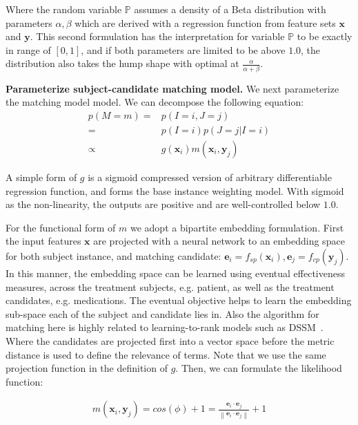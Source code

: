 \documentclass{article}
\newcommand\norm[1]{\left\lVert#1\right\rVert}
\begin{document}
Where the random variable $\mathbb{P}$ assumes a density of a Beta distribution with parameters $\alpha, \beta$ which are derived with a regression function from feature sets $\mathbf{x}$ and $\mathbf{y}$. This second formulation has the interpretation for variable $\mathbb{P}$ to be exactly in range of $[0, 1]$, and if both parameters are limited to be above $1.0$, the distribution also takes the hump shape with optimal at $\frac{\alpha}{\alpha + \beta}$. 

\textbf{Parameterize subject-candidate matching model.} We next parameterize the matching model model. 
We can decompose the following equation: 
\begin{align} 
\label{eq:matching_func} 
p(M = m) =& p (I = i, J = j) \\ =& p(I = i) p(J = j | I = i) \\ \propto& g(\mathbf{x}_i) m(\mathbf{x}_i, \mathbf{y}_j) 
\end{align} 

A simple form of $g$ is a sigmoid compressed version of arbitrary differentiable regression function, and forms the base instance weighting model. With sigmoid as the non-linearity, the outputs are positive and are well-controlled below $1.0$. 

For the functional form of $m$ we adopt a bipartite embedding formulation. First the input features $\mathbf{x}$ are projected with a neural network to an embedding space for both subject instance, and matching candidate: $\mathbf{e}_i = f_{sp} (\mathbf{x}_i), \mathbf{e}_j = f_{cp} ( \mathbf{y}_j )$. In this manner, the embedding space can be learned using eventual effectiveness measures, across the treatment subjects, e.g. patient, as well as the treatment candidates, e.g. medications. The eventual objective helps to learn the embedding sub-space each of the subject and candidate lies in. Also the algorithm for matching here is highly related to learning-to-rank models such as DSSM~\cite{huang2013learning}. Where the candidates are projected first into a vector space before the metric distance is used to define the relevance of terms. Note that we use the same projection function in the definition of $g$. Then, we can formulate the likelihood function: 

\begin{align} 
\label{eq:matching_func} 
m(\mathbf{x}_i, \mathbf{y}_j) = cos(\phi) + 1 = \frac{\mathbf{e}_i \cdot \mathbf{e}_j}{\norm{\mathbf{e}_i \cdot \mathbf{e}_j}} + 1
\end{align} 
\end{document}
